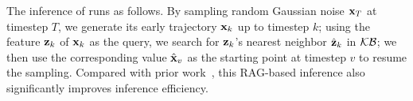     
    
    




The inference of \system runs as follows. By sampling random Gaussian noise ${\mathbf{x}}_T$ at timestep $T$, we generate its early trajectory ${\mathbf{x}}_k$ up to timestep $k$; using the feature ${\mathbf{z}}_k$ of ${\mathbf{x}}_k$ as the query, we search for ${\mathbf{z}}_k$'s nearest neighbor $\hat{{\mathbf{z}}}_k$ in ${\mathcal{K}}{\mathcal{B}}$; we then use the corresponding value $\hat{{\mathbf{x}}}_v$ as the starting point at timestep $v$ to resume the sampling. Compared with prior work~\citep{lyu2023differentially,dockhorn2022differentially}, this RAG-based inference also significantly improves inference efficiency. 



